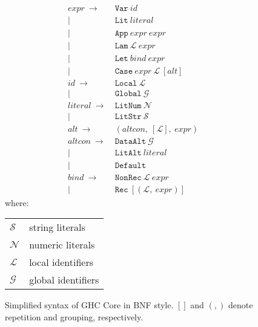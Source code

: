 \begin{figure}
  \begin{equation*}
    \begin{split}
      expr\    \rightarrow\ & \texttt{Var}\ id                                       \\
                         |\ & \texttt{Lit}\ literal                                  \\
                         |\ & \texttt{App}\ expr\ expr                               \\
                         |\ & \texttt{Lam}\ \mathcal{L}\ expr                        \\
                         |\ & \texttt{Let}\ bind\ expr                               \\
                         |\ & \texttt{Case}\ expr\ \mathcal{L}\ \left[ alt \right]   \\
      id\      \rightarrow\ & \texttt{Local}\ \mathcal{L}                            \\
                         |\ & \texttt{Global}\ \mathcal{G}                           \\
      literal\ \rightarrow\ & \texttt{LitNum}\ \mathcal{N}                           \\
                         |\ & \texttt{LitStr}\ \mathcal{S}                           \\
      alt\     \rightarrow\ & ( altcon,\ [\mathcal{L}],\ expr )                      \\
      altcon\  \rightarrow\ & \texttt{DataAlt}\ \mathcal{G}                          \\
                         |\ & \texttt{LitAlt}\ literal                               \\
                         |\ & \texttt{Default}                                       \\
      bind\    \rightarrow\ & \texttt{NonRec}\ \mathcal{L}\ expr                     \\
                         |\ & \texttt{Rec}\ [ ( \mathcal{L},\ expr ) ]
    \end{split}
  \end{equation*}
  where:
  \begin{tabular}[t]{l @{ $=$ } l}
    $\mathcal{S}$ & string literals    \\
    $\mathcal{N}$ & numeric literals   \\
    $\mathcal{L}$ & local identifiers  \\
    $\mathcal{G}$ & global identifiers
  \end{tabular}

  \caption{Simplified syntax of GHC Core in BNF style. $[]$ and $(,)$ denote repetition and grouping, respectively.}
  \label{coresyntax}
\end{figure}

